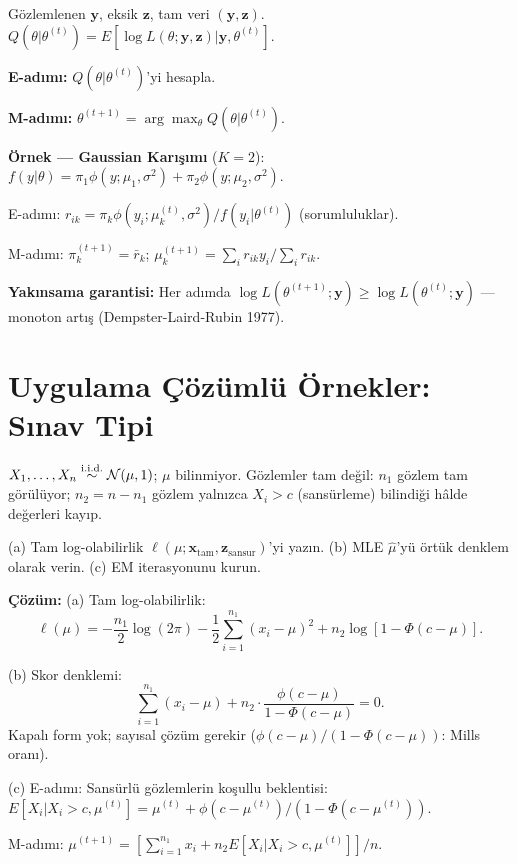 \begin{ornek}
Gözlemlenen $\mathbf{y}$, eksik $\mathbf{z}$, tam veri $(\mathbf{y},\mathbf{z})$. $Q(\theta|\theta^{(t)})=E[\log L(\theta;\mathbf{y},\mathbf{z})|\mathbf{y},\theta^{(t)}]$.

\textbf{E-adımı:} $Q(\theta|\theta^{(t)})$'yi hesapla.

\textbf{M-adımı:} $\theta^{(t+1)}=\arg\max_\theta Q(\theta|\theta^{(t)})$.

\textbf{Örnek --- Gaussian Karışımı} ($K=2$): $f(y|\theta)=\pi_1\phi(y;\mu_1,\sigma^2)+\pi_2\phi(y;\mu_2,\sigma^2)$.

E-adımı: $r_{ik}=\pi_k\phi(y_i;\mu_k^{(t)},\sigma^2)/f(y_i|\theta^{(t)})$ (sorumluluklar).

M-adımı: $\pi_k^{(t+1)}=\bar r_k$; $\mu_k^{(t+1)}=\sum_i r_{ik}y_i/\sum_i r_{ik}$.

\textbf{Yakınsama garantisi:} Her adımda $\log L(\theta^{(t+1)};\mathbf{y})\geq\log L(\theta^{(t)};\mathbf{y})$ --- monoton artış (Dempster-Laird-Rubin 1977).
\end{ornek}

\section{Uygulama Çözümlü Örnekler: Sınav Tipi}
\label{app:sinav_tipi}

\begin{ornek}
$X_1,\ldots,X_n\overset{\text{i.i.d.}}{\sim}\mathcal{N}(\mu,1)$; $\mu$ bilinmiyor. Gözlemler tam değil: $n_1$ gözlem tam görülüyor; $n_2=n-n_1$ gözlem yalnızca $X_i>c$ (sansürleme) bilindiği hâlde değerleri kayıp.

(a) Tam log-olabilirlik $\ell(\mu;\mathbf{x}_{\mathrm{tam}},\mathbf{z}_{\mathrm{sansur}})$'yi yazın.
(b) MLE $\hat\mu$'yü örtük denklem olarak verin.
(c) EM iterasyonunu kurun.

\textbf{Çözüm:}
(a) Tam log-olabilirlik:
\[
  \ell(\mu) = -\frac{n_1}{2}\log(2\pi)-\frac{1}{2}\sum_{i=1}^{n_1}(x_i-\mu)^2 + n_2\log[1-\Phi(c-\mu)].
\]

(b) Skor denklemi:
\[
  \sum_{i=1}^{n_1}(x_i-\mu) + n_2\cdot\frac{\phi(c-\mu)}{1-\Phi(c-\mu)} = 0.
\]
Kapalı form yok; sayısal çözüm gerekir ($\phi(c-\mu)/(1-\Phi(c-\mu))$: Mills oranı).

(c) E-adımı: Sansürlü gözlemlerin koşullu beklentisi:
$E[X_i|X_i>c,\mu^{(t)}]=\mu^{(t)}+\phi(c-\mu^{(t)})/(1-\Phi(c-\mu^{(t)}))$.

M-adımı: $\mu^{(t+1)}=[{\sum}_{i=1}^{n_1}x_i + n_2 E[X_i|X_i>c,\mu^{(t)}]]/n$.
\end{ornek}

